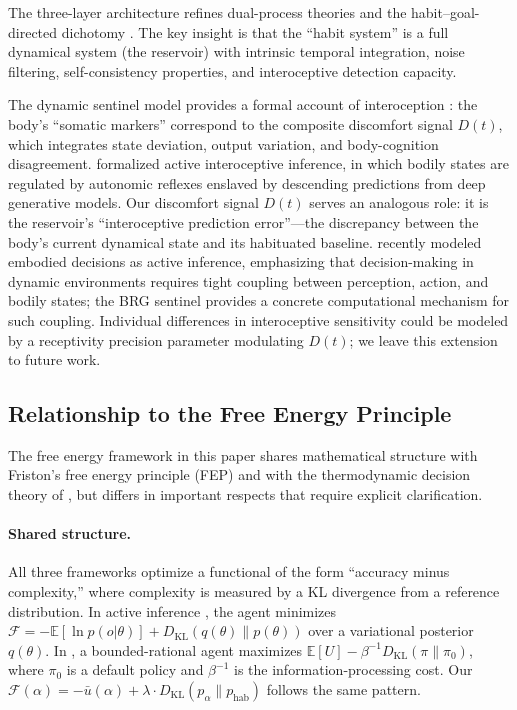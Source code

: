 \documentclass[11pt,a4paper]{article}
\theoremstyle{definition}
\newcommand{\E}{\mathbb{E}}
\newcommand{\KL}{D_{\mathrm{KL}}}
\newcommand{\FE}{\mathcal{F}}
\begin{document}
The three-layer architecture refines dual-process theories
\citep{kahneman2011} and the habit--goal-directed dichotomy
\citep{daw2005, dolan2013}.  The key insight is that the ``habit system''
is a full dynamical system (the reservoir) with intrinsic temporal
integration, noise filtering, self-consistency properties, and
interoceptive detection capacity.

The dynamic sentinel model provides a formal account of interoception
\citep{damasio1994, seth2016}: the body's ``somatic markers'' correspond to the
composite discomfort signal $D(t)$, which integrates state deviation,
output variation, and body-cognition disagreement.
\citet{seth2016} formalized active interoceptive inference, in which
bodily states are regulated by autonomic reflexes enslaved by descending
predictions from deep generative models.  Our discomfort signal $D(t)$
serves an analogous role: it is the reservoir's ``interoceptive prediction
error''---the discrepancy between the body's current dynamical state and
its habituated baseline.  \citet{pezzulo2025} recently modeled embodied
decisions as active inference, emphasizing that decision-making in
dynamic environments requires tight coupling between perception, action,
and bodily states; the BRG sentinel provides a concrete computational
mechanism for such coupling.
Individual differences
in interoceptive sensitivity could be modeled by a receptivity precision
parameter modulating $D(t)$; we leave this extension to future work.

\subsection{Relationship to the Free Energy Principle}
\label{sec:discussion_fep}

The free energy framework in this paper shares mathematical structure
with Friston's free energy principle (FEP) \citep{friston2006, friston2010}
and with the thermodynamic decision theory of \citet{ortega2013},
but differs in important respects that require explicit clarification.

\paragraph{Shared structure.}
All three frameworks optimize a functional of the form
``accuracy minus complexity,'' where complexity is measured by a KL
divergence from a reference distribution.  In active inference
\citep{friston2015, parr2022}, the agent minimizes
$\FE = -\E[\ln p(o|\theta)] + \KL(q(\theta) \| p(\theta))$
over a variational posterior $q(\theta)$.
In \citet{ortega2013}, a bounded-rational agent maximizes
$\E[U] - \beta^{-1} \KL(\pi \| \pi_0)$,
where $\pi_0$ is a default policy and $\beta^{-1}$ is the
information-processing cost.
Our $\FE(\alpha) = -\bar{u}(\alpha) + \lambda \cdot \KL(p_{\alpha} \| p_{\mathrm{hab}})$
follows the same pattern.
\end{document}
